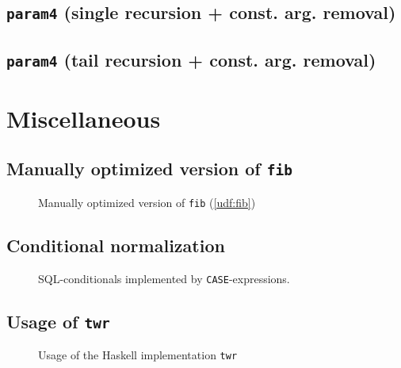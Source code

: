 \subsection{\texttt{param4} (single recursion + const. arg. removal)}
\clearpage
\newpage

\subsection{\texttt{param4} (tail recursion + const. arg. removal)}
\restoregeometry
\FloatBarrier


\section{Miscellaneous}

\subsection{Manually optimized version of \texttt{fib}}
\begin{figure}[h!]
    \centering
    
    \caption{Manually optimized version of \texttt{fib} (\autoref{udf:fib})}
    \label{udf:fib_man}
\end{figure}
\clearpage
\FloatBarrier
\newpage

\subsection{Conditional normalization}
\begin{figure}[h!]
    \centering
    \caption{SQL-conditionals implemented by \texttt{CASE}-expressions.}
    \label{conditional_normalization}
\end{figure}
\clearpage
\FloatBarrier

\subsection{Usage of \texttt{twr}}
\begin{figure}[h!]
    \centering
    
    \caption{Usage of the Haskell implementation \texttt{twr}}
\end{figure}